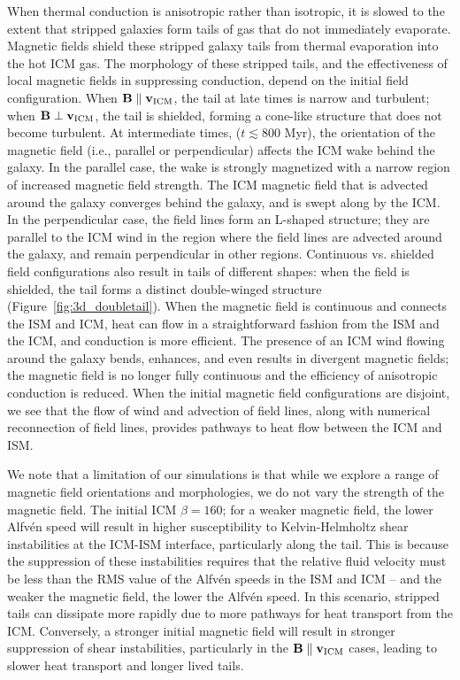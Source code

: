 \documentclass[twocolumn]{aastex6}
\begin{document}
When thermal conduction is anisotropic rather than isotropic, it is slowed to the extent that stripped galaxies form tails of gas that do not immediately evaporate. Magnetic fields shield these stripped galaxy tails from thermal evaporation into the hot ICM gas.  The morphology of these stripped tails, and the effectiveness of local magnetic fields in suppressing conduction, depend on the initial field configuration. When $\mathbf{B} \parallel \mathbf{v_{\rm ICM}}$, the tail at late times is narrow and turbulent; when $\mathbf{B} \perp \mathbf{v_{\rm ICM}}$, the tail is
shielded, forming a cone-like structure that does not become turbulent. At intermediate times, ($t \lesssim 800$ Myr), the orientation of the magnetic field (i.e., parallel or perpendicular) affects the ICM wake behind the galaxy.
In the parallel case, the wake is strongly magnetized with a narrow region of increased magnetic field strength.
The ICM magnetic field that is advected around the galaxy converges behind the galaxy, and is swept along by the ICM. In the perpendicular case, the field lines form an
L-shaped structure; they are parallel to the ICM wind in the region where the field lines are advected around the galaxy, and remain perpendicular in other regions. Continuous vs. shielded field configurations also result in tails of different shapes: when the field is shielded,
the tail forms a distinct double-winged structure
(Figure~\ref{fig:3d_doubletail}).
When the magnetic field is continuous and connects the ISM and ICM, heat can flow in a straightforward fashion from the ISM and the ICM, and conduction is more efficient. The presence of an ICM wind flowing around the galaxy bends, enhances, and even results in divergent magnetic fields; the magnetic field is no longer fully continuous and the efficiency of anisotropic conduction is reduced. When the initial magnetic field configurations are disjoint, we see that the flow of wind and advection of field lines,
along with numerical reconnection of field lines,
provides pathways to heat flow between the ICM and ISM. 

We note that a limitation of our simulations is that while we explore a range of magnetic field orientations and morphologies, we do not vary the strength of the magnetic field. The initial ICM $\beta = 160$; for a weaker magnetic field, the lower Alfv\'{e}n speed will result in higher susceptibility to Kelvin-Helmholtz shear instabilities  at the ICM-ISM interface, particularly along the tail. This is because the suppression of these instabilities requires that the relative fluid velocity must be less than the RMS value of the Alfv\'{e}n speeds in the ISM and ICM \citep{Chandrasekhar61} -- and the weaker the magnetic field, the lower the Alfv\'{e}n speed. In this scenario, stripped tails can dissipate more rapidly due to more pathways for heat transport from the ICM. Conversely, a stronger initial magnetic field will result in stronger suppression of shear instabilities, particularly in the $\mathbf{B} \parallel \mathbf{v_{\rm ICM}}$ cases, leading to slower heat transport and longer lived tails. 
\end{document}
